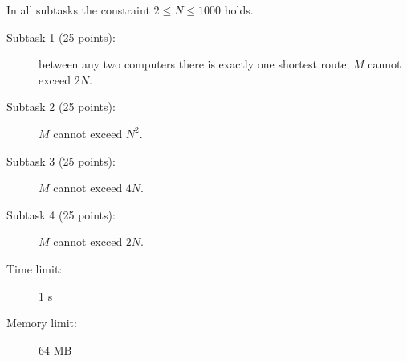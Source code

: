 \documentclass{boi2014}
\begin{document}
    \Scoring

    In all subtasks the constraint $2 \le N \le 1000$ holds.

    \begin{description}

        \item[Subtask 1 (25 points):] between
            any two computers there is exactly one shortest route; $M$
            cannot exceed $2N$.
        \item[Subtask 2 (25 points):] $M$ cannot exceed $N^2$.
        \item[Subtask 3 (25 points):] $M$ cannot exceed $4N$.
        \item[Subtask 4 (25 points):] $M$ cannot excced $2N$.
    \end{description}

    \Constraints

    \begin{description}
        \item[Time limit:] 1 s
        \item[Memory limit:] 64 MB
    \end{description}
\end{document}

